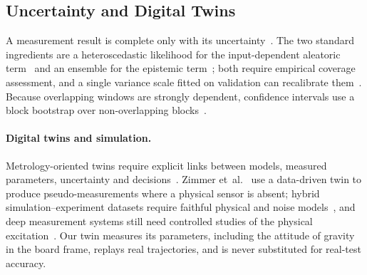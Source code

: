 \subsection{Uncertainty and Digital Twins}
A measurement result is complete only with its uncertainty~\cite{gum2008}. The two
standard ingredients are a heteroscedastic likelihood for the input-dependent
aleatoric term~\cite{kendall2017uncertainties} and an ensemble for the
epistemic term~\cite{lakshminarayanan2017simple}; both require empirical
coverage assessment, and a single variance scale fitted on validation can
recalibrate them~\cite{laves2020well}. Because overlapping windows are
strongly dependent, confidence intervals use a block bootstrap over
non-overlapping blocks~\cite{carlstein1986use,kunsch1989jackknife}.

\paragraph{Digital twins and simulation.}
Metrology-oriented twins require explicit links between models, measured
parameters, uncertainty and decisions~\cite{wright2024dt}. Zimmer
et~al.~\cite{zimmer2025digital} use a data-driven twin to produce
pseudo-measurements where a physical sensor is absent; hybrid
simulation--experiment datasets require faithful physical and noise
models~\cite{fu2023hybrid}, and deep measurement systems still need controlled
studies of the physical excitation~\cite{evans2025pattern}. Our twin measures
its parameters, including the attitude of gravity in the board frame, replays
real trajectories, and is never substituted for real-test accuracy.
